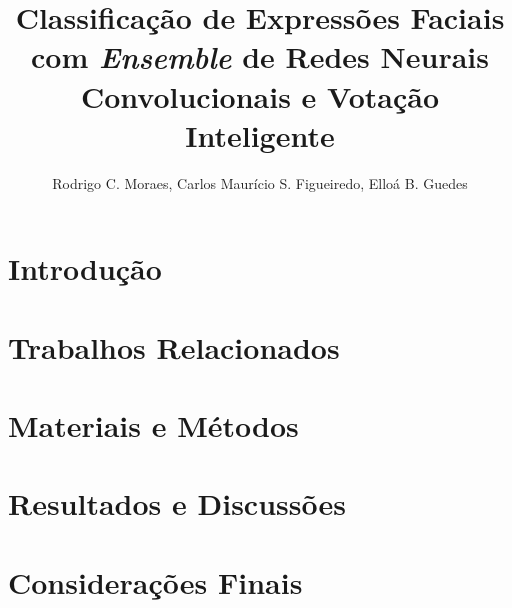 \documentclass[12pt]{article}
\title{Classificação de Expressões Faciais com \emph{Ensemble} de Redes Neurais Convolucionais e Votação Inteligente}
\author{Rodrigo C. Moraes, Carlos Maurício S. Figueiredo, Elloá B. Guedes}
\begin{document}
\maketitle




\section{Introdução}


\section{Trabalhos Relacionados}


\section{Materiais e Métodos}


\section{Resultados e Discussões}


\section{Considerações Finais}





\end{document}
